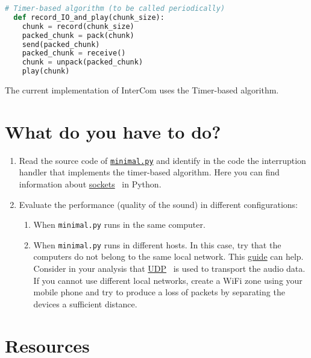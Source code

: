 \begin{lstlisting}[language=Python]
  # Timer-based algorithm (to be called periodically)
  def record_IO_and_play(chunk_size):
    chunk = record(chunk_size)
    packed_chunk = pack(chunk)
    send(packed_chunk)
    packed_chunk = receive()
    chunk = unpack(packed_chunk)
    play(chunk)
\end{lstlisting}


The current implementation of InterCom uses the Timer-based algorithm.

\section{What do you have to do?}

\begin{enumerate}

\item Read the source code of
  \href{https://github.com/Tecnologias-multimedia/intercom/blob/master/src/minimal.py}{\texttt{minimal.py}}
  and identify in the code the interruption handler that implements
  the timer-based algorithm. Here you can find information about
  \href{https://github.com/vicente-gonzalez-ruiz/YAPT/blob/master/03-IO/networking/sockets.ipynb}{sockets}~\cite{YAPT} in Python.
  
\item Evaluate the performance (quality of the sound) in different configurations:
  \begin{enumerate}
  \item When \verb|minimal.py| runs in the same computer.
  \item When \verb|minimal.py| runs in different hosts. In this case,
    try that the computers do not belong to the same local
    network. This
    \href{https://www.noip.com/support/knowledgebase/general-port-forwarding-guide/}{guide}
    can help. Consider in your analysis that
    \href{https://en.wikipedia.org/wiki/User_Datagram_Protocol}{UDP}~\cite{UDP}
    is used to transport the audio data. If you cannot use different
    local networks, create a WiFi zone using your mobile phone and try
    to produce a loss of packets by separating the devices a
    sufficient distance.
  \end{enumerate}
\end{enumerate}

\section{Resources}


